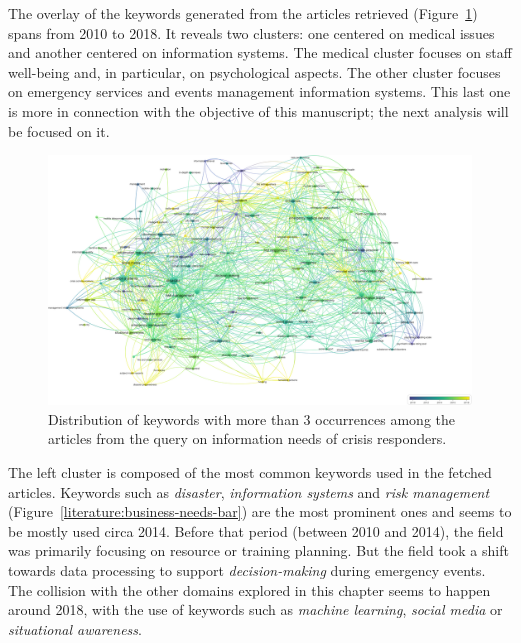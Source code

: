 The overlay of the keywords generated from the articles retrieved (Figure~\ref{literature:business-needs-overlay}) spans from 2010 to 2018.
It reveals two clusters: one centered on medical issues and another centered on information systems.
The medical cluster focuses on staff well-being and, in particular, on psychological aspects.
The other cluster focuses on emergency services and events management information systems.
This last one is more in connection with the objective of this manuscript; the next analysis will be focused on it.

\begin{landscape}
    \begin{figure}[hp]
        \includegraphics[width=\paperwidth,height=\paperheight,keepaspectratio]{figures/chap-2/business-needs-overlay.pdf}
        \caption{Distribution of keywords with more than 3 occurrences among the articles from the query on information needs of crisis responders.}
        \label{literature:business-needs-overlay}
    \end{figure}
\end{landscape}

The left cluster is composed of the most common keywords used in the fetched articles.
Keywords such as \emph{disaster}, \emph{information systems} and \emph{risk management} (Figure~\ref{literature:business-needs-bar}) are the most prominent ones and seems to be mostly used circa 2014.
Before that period (between 2010 and 2014), the field was primarily focusing on resource or training planning.
But the field took a shift towards data processing to support \emph{decision-making} during emergency events.
The collision with the other domains explored in this chapter seems to happen around 2018, with the use of keywords such as \emph{machine learning}, \emph{social media} or \emph{situational awareness}.

